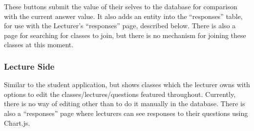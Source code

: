 \documentclass{article}
\begin{document}
These buttons submit the value of their selves to the database for comparison with the current answer value. It also adds an entity into the ``responses'' table, for use with the Lecturer's ``responses'' page, described below. There is also a page for searching for classes to join, but there is no mechanism for joining these classes at this moment.

\subsubsection{Lecture Side}
Similar to the student application, but shows classes which the lecturer owns with options to edit the classes/lectures/questions featured throughout. Currently, there is no way of editing  other than to do it manually in the database. There is also a ``responses'' page where lecturers can see responses to their questions using Chart.js.
\end{document}
